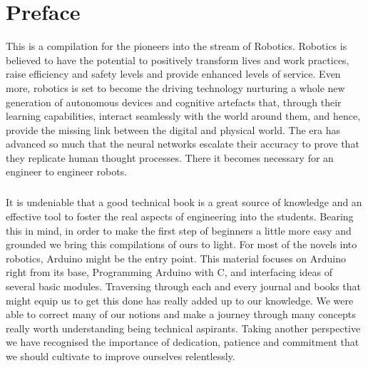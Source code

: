 \chapter*{Preface}
\begin{fullwidth}
\justify
\par This is a compilation for the pioneers into the stream of Robotics. Robotics is believed to have the potential to positively transform lives and work practices, raise efficiency and safety levels and provide enhanced levels of service. Even more, robotics is set to become the driving technology nurturing a whole new generation of autonomous devices and cognitive artefacts that, through their learning capabilities, interact seamlessly with the world around them, and hence, provide the missing link between the digital and physical world. The era has advanced so much that the neural networks escalate their accuracy to prove that they replicate human thought processes. There it becomes necessary for an engineer to engineer robots.
\vspace{5mm}
\paragraph{ } It is undeniable that a good technical book is a great source of knowledge and an effective tool to foster the real aspects of engineering into the students. Bearing this in mind, in order to make the first step of beginners a little more easy and grounded we bring this compilations of ours to light. For most of the novels into robotics, Arduino might be the entry point. This material focuses on Arduino right from its base, Programming Arduino with C, and interfacing ideas of several basic modules. Traversing through each and every journal and books that might equip us to get this done has really added up to our knowledge. We were able to correct many of our notions and make a journey through many concepts really worth understanding being technical aspirants. Taking another perspective we have recognised the importance of dedication, patience and commitment that we should cultivate to improve ourselves relentlessly.
\end{fullwidth}